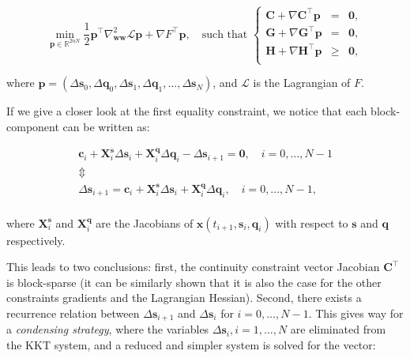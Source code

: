\begin{equation}
  \min_{\mathbf{p}\in\mathbb R^{2nN}}
  \frac{1}{2}\mathbf{p}^\top\nabla^2_{\mathbf{w}\mathbf{w}}\mathcal{L}\mathbf{p} + \nabla
  F^\top\mathbf{p},
  \quad \text{such that }
  \left\{\begin{array}{rcl}
  \mathbf{C} + \nabla \mathbf{C}^\top\mathbf{p} &=& \mathbf{0},\\
  \mathbf{G} + \nabla \mathbf{G}^\top\mathbf{p} &=& \mathbf{0},\\
  \mathbf{H} + \nabla \mathbf{H}^\top\mathbf{p} &\ge& \mathbf{0},\\
  \end{array}\right.
\end{equation}

\noindent where $\mathbf{p}=
(\Delta\mathbf{s}_0,\Delta\mathbf{q}_0,\Delta\mathbf{s}_1,\Delta\mathbf{q}_1,\ldots,\Delta\mathbf{s}_N)$,
and $\mathcal{L}$ is the Lagrangian of $F$.

If we give a closer look at the first equality constraint, we notice
that each block-component can be written as:

\begin{equation}
\label{eq:chap3-ms-recurrence}
\begin{array}{c}
\mathbf{c}_i +
\mathbf{X}_i^\mathbf{s}\Delta\mathbf{s}_i +
\mathbf{X}_i^\mathbf{q}\Delta\mathbf{q}_i - \Delta\mathbf{s}_{i+1}=\mathbf{0}, \quad i=0,\ldots,N-1\\
\Updownarrow\\
\Delta\mathbf{s}_{i+1}=\mathbf{c}_i + \mathbf{X}_i^\mathbf{s}\Delta\mathbf{s}_i +
\mathbf{X}_i^\mathbf{q}\Delta\mathbf{q}_i, \quad i=0,\ldots,N-1,\\
\end{array}
\end{equation}

\noindent where $\mathbf{X}_i^\mathbf{s}$ and $\mathbf{X}_i^\mathbf{q}$ are the
Jacobians of $\mathbf{x}(t_{i+1},\mathbf{s}_i,\mathbf{q}_i)$ with
respect to $\mathbf{s}$ and $\mathbf{q}$ respectively.

This leads to two conclusions: first, the continuity constraint vector
Jacobian $\mathbf{C}^\top$ is block-sparse (it can be similarly shown
that it is also the case for the other constraints gradients and the
Lagrangian Hessian). Second, there exists a recurrence relation
between $\Delta\mathbf{s}_{i+1}$ and $\Delta\mathbf{s}_i$ for
$i=0,\ldots,N-1$. This gives way for a \emph{condensing strategy},
where the variables $\Delta\mathbf{s}_i, i=1,\ldots,N$ are eliminated
from the KKT system, and a reduced and simpler system is solved for
the vector:

